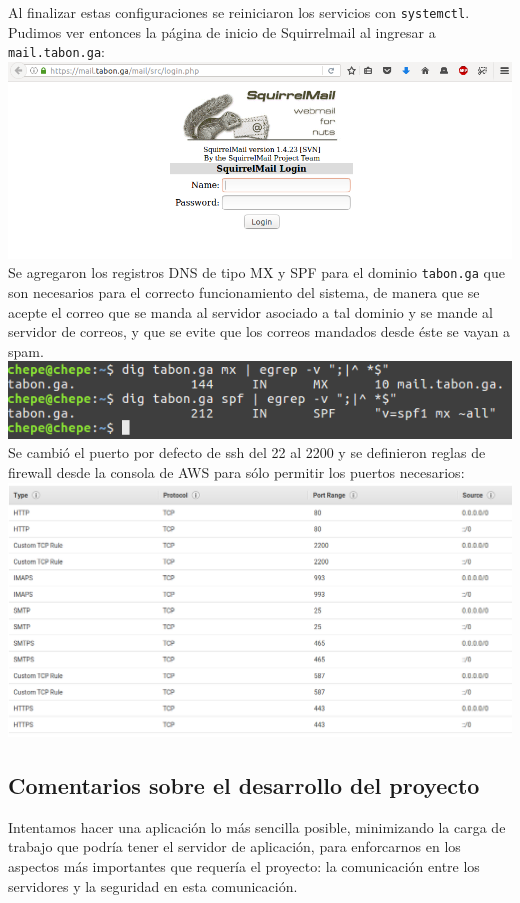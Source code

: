 \documentclass[9pt]{article}
\begin{document}
Al finalizar estas configuraciones se reiniciaron los servicios con \texttt{systemctl}. \\

Pudimos ver entonces la página de inicio de Squirrelmail al ingresar a \texttt{mail.tabon.ga}: \\
\includegraphics[scale=0.4]{mail/04} \\

Se agregaron los registros DNS de tipo MX y SPF para el dominio \texttt{tabon.ga} que son necesarios para el correcto funcionamiento del sistema, de manera que se acepte el correo que se manda al servidor asociado a tal dominio y se mande al servidor de correos, y que se evite que los correos mandados desde éste se vayan a spam. \\

\includegraphics[scale=0.5]{mail/01} \\

Se cambió el puerto por defecto de ssh del 22 al 2200 y se definieron reglas de firewall desde la consola de AWS para sólo permitir los puertos necesarios: \\

\includegraphics[scale=0.3]{mail/03} \\

\subsection*{Comentarios sobre el desarrollo del proyecto}
Intentamos hacer una aplicación lo más sencilla posible, minimizando la carga de trabajo que podría tener el servidor de aplicación, para enforcarnos en los aspectos más importantes que requería el proyecto: la comunicación entre los servidores y la seguridad en esta comunicación. %
\end{document}
